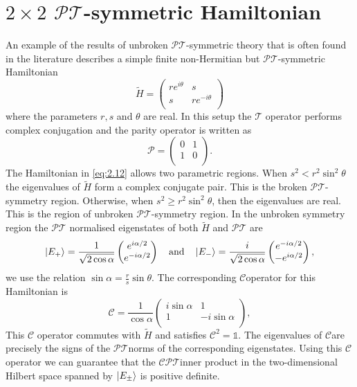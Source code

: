 \documentclass[12pt, a4paper]{report}
\newcommand\PT{\(\mathcal{PT}\)}
\newcommand\TT{\(\mathcal{T}\)}
\newcommand\CC{\(\mathcal{C}\)}
\begin{document}
\section{$2\times2$ \PT-symmetric Hamiltonian}
An example of the results of unbroken \PT-symmetric theory that is often found in the literature describes a simple finite non-Hermitian but \PT-symmetric Hamiltonian
\begin{equation}\label{eq:2.12}
\tilde{H} = \begin{pmatrix}
re^{i\theta} & s  \\
s & re^{-i\theta} \\
\end{pmatrix}
\end{equation}
where the parameters $r, s$ and $\theta$ are real. In this setup the \TT\: operator performs complex conjugation and the parity operator is written as
\begin{equation}\label{eq:2.13}
\mathcal{P} = \begin{pmatrix}
0 & 1  \\
1 & 0 \\
\end{pmatrix}.
\end{equation}
The Hamiltonian in \ref{eq:2.12} allows two parametric regions. When $s^2 < r^2\sin^2\theta$ the eigenvalues of $\tilde{H}$ form a complex conjugate pair. This is the broken \PT-symmetry region. Otherwise, when $s^2 \geq r^2\sin^2\theta$, then the eigenvalues are real. This is the region of unbroken \PT-symmetry region. In the unbroken symmetry region the \PT\: normalised eigenstates of both $\tilde{H}$ and \PT\: are
\begin{equation}\label{eq:2.14}
\ket{E_{+}} = \frac{1}{\sqrt{2\cos\alpha}}\begin{pmatrix}
e^{i\alpha/2} \\
e^{-i\alpha/2} \\
\end{pmatrix}\quad\mathrm{and}\quad\ket{E_{-}} = \frac{i}{\sqrt{2\cos\alpha}}\begin{pmatrix}
e^{-i\alpha/2} \\
-e^{i\alpha/2} \\
\end{pmatrix},
\end{equation}
we use the relation $\sin\alpha = \frac{r}{s}\sin\theta$.
The corresponding \CC operator for this Hamiltonian is 
\begin{equation}\label{eq:2.15}
\mathcal{C} = \frac{1}{\cos\alpha}\begin{pmatrix}
i\sin\alpha & 1 \\
1 & -i\sin\alpha\\
\end{pmatrix},
\end{equation}
This \CC\: operator commutes with $\tilde{H}$ and satisfies $\mathcal{C}^2= \mathds{1}$. The eigenvalues of \CC\:are precisely the signs of the \PT\:norms of the corresponding eigenstates\cite{Bender_2004}. Using this \CC\: operator we can guarantee that the \CC\PT inner product in the two-dimensional Hilbert space spanned by $\ket{E_{\pm}}$ is positive definite.
\end{document}

